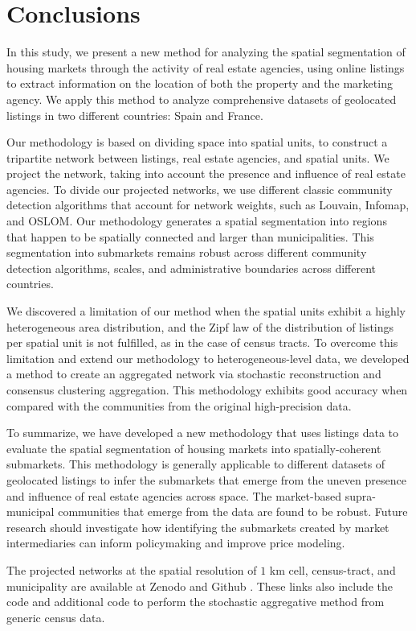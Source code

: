 \section{Conclusions}
\label{sec:conclusions}

In this study, we present a new method for analyzing the spatial segmentation of housing markets through the activity of real estate agencies, using online listings to extract information on the location of both the property and the marketing agency. We apply this method to analyze comprehensive datasets of geolocated listings in two different countries: Spain and France. 

Our methodology is based on dividing space into spatial units, to construct a tripartite network between listings, real estate agencies, and spatial units. We project the network, taking into account the presence and influence of real estate agencies. To divide our projected networks, we use different classic community detection algorithms that account for network weights, such as Louvain, Infomap, and OSLOM. Our methodology generates a spatial segmentation into regions that happen to be spatially connected and larger than municipalities. This segmentation into submarkets remains robust across different community detection algorithms, scales, and administrative boundaries across different countries.

We discovered a limitation of our method when the spatial units exhibit a highly heterogeneous area distribution, and the Zipf law of the distribution of listings per spatial unit is not fulfilled, as in the case of census tracts. To overcome this limitation and extend our methodology to heterogeneous-level data, we developed a method to create an aggregated network via stochastic reconstruction and consensus clustering aggregation. This methodology exhibits good accuracy when compared with the communities from the original high-precision data.

To summarize, we have developed a new methodology that uses listings data to evaluate the spatial segmentation of housing markets into spatially-coherent submarkets. This methodology is generally applicable to different datasets of geolocated listings to infer the submarkets that emerge from the uneven presence and influence of real estate agencies across space. The market-based supra-municipal communities that emerge from the data are found to be robust. Future research should investigate how identifying the submarkets created by market intermediaries can inform policymaking and improve price modeling.

The projected networks at the spatial resolution of $1$ km cell, census-tract, and municipality are available at Zenodo \cite{zenodo-2024} and Github \cite{Abella-github-2024}. These links also include the code and additional code to perform the stochastic aggregative method from generic census data.

